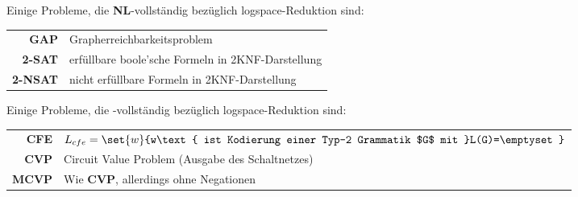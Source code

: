 Einige Probleme, die \textbf{NL}-vollständig bezüglich logspace-Reduktion sind:
\begin{center}
	\begin{tabular}{r|l}
		\textbf{GAP} & Grapherreichbarkeitsproblem\\
		\textbf{2-SAT} & erfüllbare boole'sche Formeln in 2KNF-Darstellung\\
		\textbf{2-NSAT} & nicht erfüllbare Formeln in 2KNF-Darstellung
	\end{tabular}
\end{center}

Einige Probleme, die \poly-vollständig bezüglich logspace-Reduktion sind:
\begin{center}
	\begin{tabular}{r|l}
		\textbf{CFE} & $L_{cfe}=\set{w}{w\text{ ist Kodierung einer Typ-2 Grammatik $G$ mit }L(G)=\emptyset}$\\
		\textbf{CVP} & Circuit Value Problem (Ausgabe des Schaltnetzes)\\
		\textbf{MCVP} & Wie \textbf{CVP}, allerdings ohne Negationen
	\end{tabular}
\end{center}
